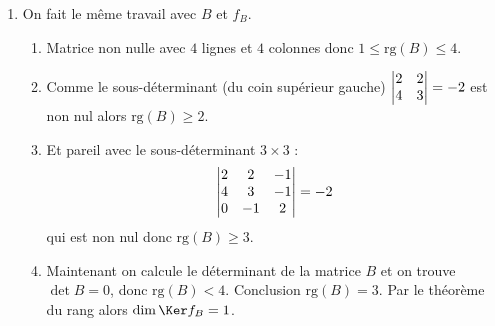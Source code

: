 {{\begin{enumerate}
\begin{enumerate}
     \item Pour un base de l'image, qui est de dimension $2$, 
     il suffit par exemple de prendre les deux premiers vecteurs colonnes de la matrice $A$ (ils sont clairement non colinéaires) :
$$\Im f_A = \textrm{Vect} \left\{ v_1, v_2 \right\} = 
\textrm{Vect} \left\{  \begin{pmatrix}1\\3\\5\\7\end{pmatrix},  \begin{pmatrix}1\\1\\1\\1\end{pmatrix} \right\}
$$

  \end{enumerate}


  \item On fait le même travail avec $B$ et $f_B$.
  \begin{enumerate}
     \item Matrice non nulle avec $4$ lignes et $4$ colonnes donc $1 \le \textrm{rg}(B) \le 4$.

     \item Comme le sous-déterminant (du coin supérieur gauche)
$\begin{vmatrix} 
2 & 2 \cr
4 & 3 \cr
\end{vmatrix}= -2$ est non nul alors $\textrm{rg}(B) \ge 2$.

     \item Et pareil avec le sous-déterminant $3\times 3$ :
$$\begin{vmatrix} 
2 & 2 & -1 \cr
4 & 3 & -1 \cr
0 & -1 & 2 \cr
\end{vmatrix} = -2$$
qui est non nul donc $\textrm{rg}(B) \ge 3$.

     \item Maintenant on calcule le déterminant de la matrice $B$ et 
on trouve $\det B = 0$, donc $\textrm{rg}(B) < 4$. Conclusion $\textrm{rg}(B) = 3$.
Par le théorème du rang alors $\dim \Ker f_B=1$.




\end{enumerate}
\end{enumerate}}}
